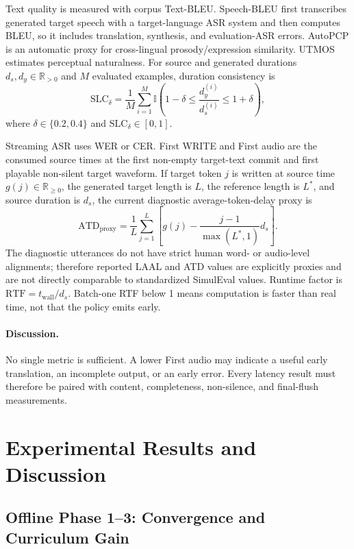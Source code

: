 \documentclass[11pt,a4paper]{article}
\newcommand{\R}{\mathbb{R}}
\begin{document}
Text quality is measured with corpus Text-BLEU. Speech-BLEU first transcribes generated target speech with a target-language ASR system and then computes BLEU, so it includes translation, synthesis, and evaluation-ASR errors. AutoPCP is an automatic proxy for cross-lingual prosody/expression similarity. UTMOS estimates perceptual naturalness. For source and generated durations $d_s,d_y\in\R_{>0}$ and $M$ evaluated examples, duration consistency is
\begin{equation}
 \mathrm{SLC}_{\delta}
 =\frac1M\sum_{i=1}^{M}
 \mathbb{I}\left(1-\delta\le\frac{d_y^{(i)}}{d_s^{(i)}}\le1+\delta\right),
 \label{eq:slc}
\end{equation}
where $\delta\in\{0.2,0.4\}$ and $\mathrm{SLC}_{\delta}\in[0,1]$.

Streaming ASR uses WER or CER. First WRITE and First audio are the consumed source times at the first non-empty target-text commit and first playable non-silent target waveform. If target token $j$ is written at source time $g(j)\in\R_{\ge0}$, the generated target length is $L$, the reference length is $L^*$, and source duration is $d_s$, the current diagnostic average-token-delay proxy is
\begin{equation}
 \mathrm{ATD}_{\mathrm{proxy}}
 =\frac{1}{L}\sum_{j=1}^{L}\left[g(j)-\frac{j-1}{\max(L^*,1)}d_s\right].
 \label{eq:atdproxy}
\end{equation}
The diagnostic utterances do not have strict human word- or audio-level alignments; therefore reported LAAL and ATD values are explicitly proxies and are not directly comparable to standardized SimulEval values. Runtime factor is $\mathrm{RTF}=t_{\mathrm{wall}}/d_s$. Batch-one RTF below 1 means computation is faster than real time, not that the policy emits early.

\paragraph{Discussion.}
No single metric is sufficient. A lower First audio may indicate a useful early translation, an incomplete output, or an early error. Every latency result must therefore be paired with content, completeness, non-silence, and final-flush measurements.

\section{Experimental Results and Discussion}

\subsection{Offline Phase 1--3: Convergence and Curriculum Gain}
\end{document}

